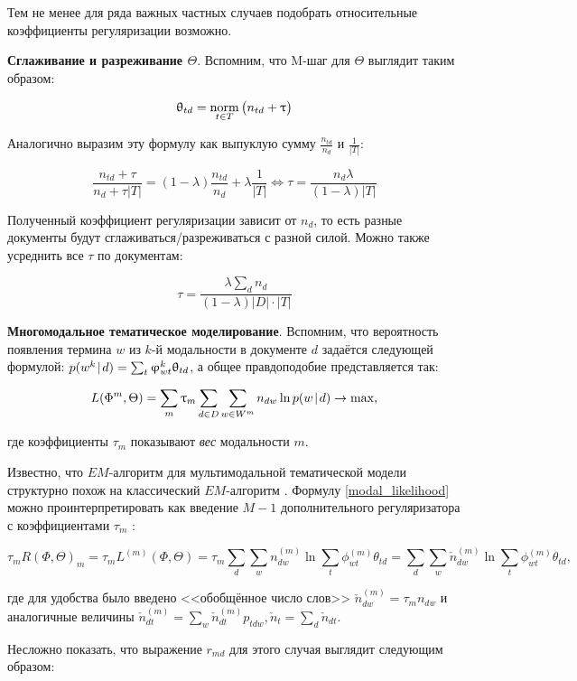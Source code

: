 Тем не менее для ряда важных частных случаев подобрать относительные коэффициенты регуляризации возможно.

\textbf{Сглаживание и разреживание $\Theta$}. Вспомним, что M-шаг для $\Theta$ выглядит таким образом:

\[
\uptheta_{td} = \mathop{\mathrm{norm}}\limits_{t \in T} \big( n_{td} + \uptau \big)
\]

Аналогично выразим эту формулу как выпуклую сумму $\frac{n_{td}}{n_d}$ и $\frac{1}{|T|}$:

\[
\frac{n_{td} + \tau}{n_d + \tau |T|} = (1-\lambda) \frac{n_{td}}{n_d} + \lambda \frac{1}{|T|} \iff \tau = \frac{n_d \lambda}{(1-\lambda) |T|} \label{sp_theta_rel2abs}
\]

Полученный коэффициент регуляризации зависит от $n_d$, то есть разные документы будут сглаживаться/разреживаться с разной силой. Можно также усреднить все $\tau$ по документам:

\[
\tau = \frac{\lambda \sum_d n_d }{(1-\lambda) |D| \cdot |T|} \label{sp_theta_rel2abs_avg}
\]

\textbf{Многомодальное тематическое моделирование}. Вспомним, что вероятность появления термина $w$ из $k$-й модальности в документе $d$ задаётся следующей формулой: $p(w^k \mspace{2mu}{|}\mspace{2mu} d) = \sum_t \upvarphi_{wt}^k \uptheta_{td}$, а общее правдоподобие представляется так:

\[
L(\Phi^m, \Theta) = \sum_m \uptau_m \sum_{d\in D} \sum_{w \in W^m} n_{dw} \ln p(w \mspace{2mu}{|}\mspace{2mu} d) \rightarrow \max, \label{modal_likelihood}
\]

где коэффициенты $\tau_m$ показывают \textit{вес} модальности $m$.

Известно, что $EM$-алгоритм для мультимодальной тематической модели структурно похож на классический $EM$-алгоритм \cite{voron15nonbayesian}. Формулу \ref{modal_likelihood} можно проинтерпретировать как введение $M-1$ дополнительного регуляризатора с коэффициентами $\tau_m$ \cite{voron15nonbayesian}:

\[
\tau_m R(\Phi, \Theta)_m = \tau_m L^{(m)}(\Phi, \Theta) = \tau_m  \sum_d \sum_w n_{dw}^{(m)} \ln \sum_t \phi_{wt}^{(m)}\theta_{td} =
\sum_d \sum_w \check{n}_{dw}^{(m)} \ln \sum_t \phi_{wt}^{(m)}\theta_{td},
\]

где для удобства было введено <<обобщённое число слов>> $\check{n}_{dw}^{(m)} = \tau_m n_{dw}$ и аналогичные величины $\check{n}_{dt}^{(m)} = \sum_w \check{n}_{dt}^{(m)} p_{tdw}, \check{n}_t = \sum_d \check{n}_{dt}$.

Несложно показать, что выражение $r_{md}$ для этого случая выглядит следующим образом:

